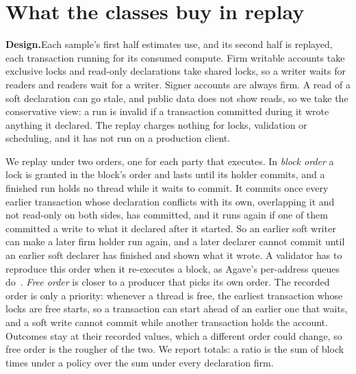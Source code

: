\documentclass[conference,compsoc]{IEEEtran}
\numberwithin{equation}{section}
\theoremstyle{plain}
\theoremstyle{definition}
\theoremstyle{remark}
\newcommand{\runin}[1]{\par\smallskip\noindent\textbf{#1.}\enspace}
\begin{document}
\section{What the classes buy in replay}\label{sec:replay}

\runin{Design}Each sample's first half estimates use, and its second half is replayed, each transaction running for its consumed compute. Firm writable accounts take exclusive locks and read-only declarations take shared locks, so a writer waits for readers and readers wait for a writer. Signer accounts are always firm. A read of a soft declaration can go stale, and public data does not show reads, so we take the conservative view: a run is invalid if a transaction committed during it wrote anything it declared. The replay charges nothing for locks, validation or scheduling, and it has not run on a production client.

We replay under two orders, one for each party that executes. In \emph{block order} a lock is granted in the block's order and lasts until its holder commits, and a finished run holds no thread while it waits to commit. It commits once every earlier transaction whose declaration conflicts with its own, overlapping it and not read-only on both sides, has committed, and it runs again if one of them committed a write to what it declared after it started. So an earlier soft writer can make a later firm holder run again, and a later declarer cannot commit until an earlier soft declarer has finished and shown what it wrote. A validator has to reproduce this order when it re-executes a block, as Agave's per-address queues do~\cite{agave}. \emph{Free order} is closer to a producer that picks its own order. The recorded order is only a priority: whenever a thread is free, the earliest transaction whose locks are free starts, so a transaction can start ahead of an earlier one that waits, and a soft write cannot commit while another transaction holds the account. Outcomes stay at their recorded values, which a different order could change, so free order is the rougher of the two. We report totals: a ratio is the sum of block times under a policy over the sum under every declaration firm.
\end{document}
